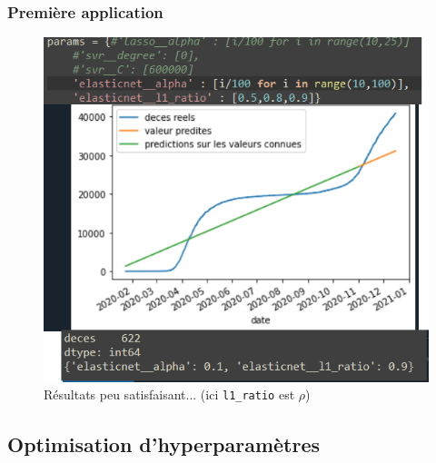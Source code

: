 \documentclass{beamer}[aspectratio = 43]
\begin{document}
\begin{frame}
	\frametitle{Première application}
	\begin{figure}
		\includegraphics[scale=0.38]{EN}
		\caption{Résultats peu satisfaisant... (ici \texttt{l1\_ratio} est $\rho$)}
	\end{figure}
\end{frame}

\subsection{Optimisation d'hyperparamètres}
\end{document}
